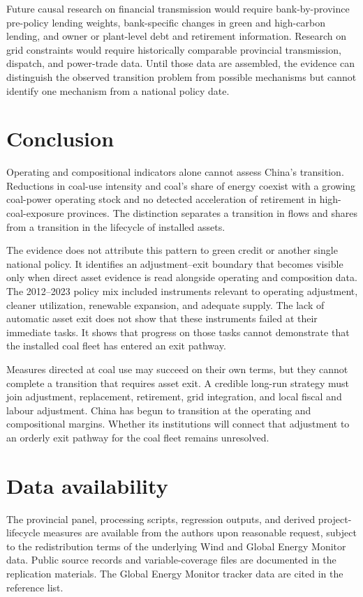 \documentclass[11pt]{article}
\begin{document}
Future causal research on financial transmission would require bank-by-province pre-policy lending weights, bank-specific changes in green and high-carbon lending, and owner or plant-level debt and retirement information. Research on grid constraints would require historically comparable provincial transmission, dispatch, and power-trade data. Until those data are assembled, the evidence can distinguish the observed transition problem from possible mechanisms but cannot identify one mechanism from a national policy date.

\section{Conclusion}

Operating and compositional indicators alone cannot assess China's transition. Reductions in coal-use intensity and coal's share of energy coexist with a growing coal-power operating stock and no detected acceleration of retirement in high-coal-exposure provinces. The distinction separates a transition in flows and shares from a transition in the lifecycle of installed assets.

The evidence does not attribute this pattern to green credit or another single national policy. It identifies an adjustment--exit boundary that becomes visible only when direct asset evidence is read alongside operating and composition data. The 2012--2023 policy mix included instruments relevant to operating adjustment, cleaner utilization, renewable expansion, and adequate supply. The lack of automatic asset exit does not show that these instruments failed at their immediate tasks. It shows that progress on those tasks cannot demonstrate that the installed coal fleet has entered an exit pathway.

Measures directed at coal use may succeed on their own terms, but they cannot complete a transition that requires asset exit. A credible long-run strategy must join adjustment, replacement, retirement, grid integration, and local fiscal and labour adjustment. China has begun to transition at the operating and compositional margins. Whether its institutions will connect that adjustment to an orderly exit pathway for the coal fleet remains unresolved.

\section*{Data availability}
The provincial panel, processing scripts, regression outputs, and derived project-lifecycle measures are available from the authors upon reasonable request, subject to the redistribution terms of the underlying Wind and Global Energy Monitor data. Public source records and variable-coverage files are documented in the replication materials. The Global Energy Monitor tracker data are cited in the reference list.
\end{document}
